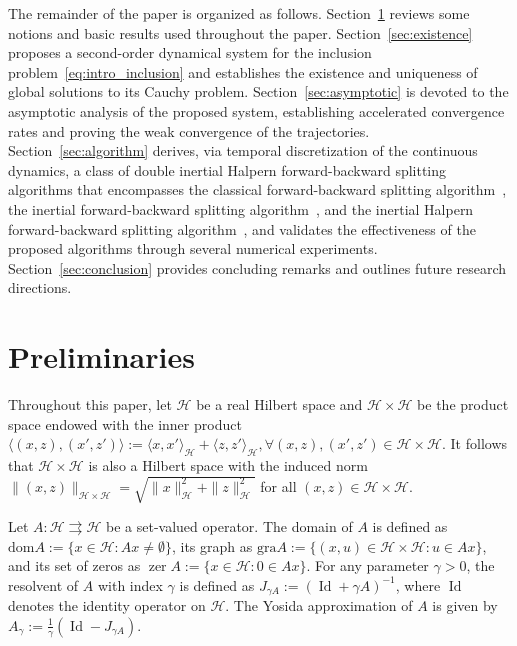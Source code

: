 \documentclass{article}
\theoremstyle{definition}
\theoremstyle{definition}
\theoremstyle{definition}
\begin{document}
The remainder of the paper is organized as follows. Section~\ref{sec:prelim} reviews some notions and basic results used throughout the paper. Section~\ref{sec:existence} proposes a second-order dynamical system for the inclusion problem~\eqref{eq:intro_inclusion} and establishes the existence and uniqueness of global solutions to its Cauchy problem. Section~\ref{sec:asymptotic} is devoted to the asymptotic analysis of the proposed system, establishing accelerated convergence rates and proving the weak convergence of the trajectories. Section~\ref{sec:algorithm} derives, via temporal discretization of the continuous dynamics, a class of double inertial Halpern forward-backward splitting algorithms that encompasses the classical forward-backward splitting algorithm~\cite{Combettes}, the inertial forward-backward splitting algorithm~\cite{lorenz2015inertial}, and the inertial Halpern forward-backward splitting algorithm~\cite{cholamjiak2018inertial}, and validates the effectiveness of the proposed algorithms through several numerical experiments. Section~\ref{sec:conclusion} provides concluding remarks and outlines future research directions.

\section{Preliminaries}
\label{sec:prelim}
Throughout this paper, let $\mathcal{H}$ be a real Hilbert space and $\mathcal{H} \times \mathcal{H}$ be the product space endowed with the inner product $\langle (x, z), (x', z') \rangle := \langle x, x' \rangle_{\mathcal{H}} + \langle z, z' \rangle_{\mathcal{H}}, \forall (x, z), (x', z') \in \mathcal{H} \times \mathcal{H}$. 
It follows that $\mathcal{H} \times \mathcal{H}$ is also a Hilbert space with the induced norm $\|(x, z)\|_{\mathcal{H} \times \mathcal{H}} = \sqrt{\|x\|_{\mathcal{H}}^2 + \|z\|_{\mathcal{H}}^2}$ for all $(x, z) \in \mathcal{H} \times \mathcal{H}$.
\vskip 1mm

Let $A:\mathcal{H} \rightrightarrows \mathcal{H}$ be a set-valued operator. The domain of $A$ is defined as $\mathrm{dom} A := \{x \in \mathcal{H} : Ax \neq \emptyset\}$, its graph as $\mathrm{gra} A := \{(x, u) \in \mathcal{H} \times \mathcal{H} : u \in Ax\}$, and its set of zeros as $\operatorname{zer} A := \{x \in \mathcal{H} : 0 \in Ax\}$. For any parameter $\gamma > 0$, the resolvent of $A$ with index $\gamma$ is defined as $J_{\gamma A} := (\operatorname{Id} + \gamma A)^{-1}$, where $\operatorname{Id}$ denotes the identity operator on $\mathcal{H}$. The Yosida approximation of $A$ is given by $A_\gamma := \frac{1}{\gamma} (\operatorname{Id} - J_{\gamma A})$. 
\end{document}
